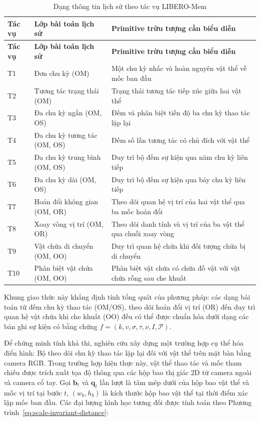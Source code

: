 \begingroup\small\setlength{\tabcolsep}{4pt}\renewcommand{\arraystretch}{1.12}
\begin{longtable}{>{\raggedright\arraybackslash}p{}|>{\raggedright\arraybackslash}p{}|>{\raggedright\arraybackslash}p{}}
\caption{Dạng thông tin lịch sử theo tác vụ LIBERO-Mem}\label{tab:memory-task-families}\\
\toprule
\textbf{Tác vụ} & \textbf{Lớp bài toán lịch sử} & \textbf{Primitive trừu tượng cần biểu diễn} \\
\midrule\endfirsthead
\toprule
\textbf{Tác vụ} & \textbf{Lớp bài toán lịch sử} & \textbf{Primitive trừu tượng cần biểu diễn} \\
\midrule\endhead
\bottomrule\endfoot
T1 & Đơn chu kỳ (OM) & Một chu kỳ nhấc và hoàn nguyên vật thể về mốc ban đầu \\
T2 & Tương tác trạng thái (OM) & Trạng thái tương tác tiếp xúc giữa hai vật thể \\
T3 & Đa chu kỳ ngắn (OM, OS) & Đếm và phân biệt tiến độ ba chu kỳ thao tác lặp lại \\
T4 & Đa chu kỳ tương tác (OM, OS) & Đếm số lần tương tác có chủ đích với vật thể \\
T5 & Đa chu kỳ trung bình (OM, OS) & Duy trì bộ đếm sự kiện qua năm chu kỳ liên tiếp \\
T6 & Đa chu kỳ dài (OM, OS) & Duy trì bộ đếm sự kiện qua bảy chu kỳ liên tiếp \\
T7 & Hoán đổi không gian (OM, OR) & Theo dõi quan hệ vị trí của hai vật thể qua ba mốc hoán đổi \\
T8 & Xoay vòng vị trí (OM, OR) & Theo dõi danh tính và vị trí của ba vật thể qua chuỗi xoay vòng \\
T9 & Vật chứa di chuyển (OM, OO) & Duy trì quan hệ chứa khi đối tượng chứa bị di chuyển \\
T10 & Phân biệt vật chứa (OM, OO) & Phân biệt vật chứa có chứa đồ vật với vật chứa rỗng sau che khuất \\
\end{longtable}
\endgroup

Khung giao thức này khẳng định tính tổng quát của phương pháp: các dạng bài toán từ đếm chu kỳ thao tác (OM/OS), theo dõi hoán đổi vị trí (OR) đến duy trì quan hệ vật chứa khi che khuất (OO) đều có thể được chuẩn hóa dưới dạng các bản ghi sự kiện có bằng chứng $f = (k, v, \sigma, \tau, \nu, I, \mathcal P)$.

Để chứng minh tính khả thi, nghiên cứu xây dựng một trường hợp cụ thể hóa điển hình: Bộ theo dõi chu kỳ thao tác lặp lại đối với vật thể trên mặt bàn bằng camera RGB. Trong trường hợp hiện thực này, vật thể thao tác và mốc tham chiếu được trích xuất tọa độ thông qua các hộp bao thị giác 2D từ camera ngoài và camera cổ tay. Gọi $\mathbf b_t$ và $\mathbf q_t$ lần lượt là tâm mép dưới của hộp bao vật thể và mốc vị trí tại bước $t$, $(w_b, h_b)$ là kích thước hộp bao vật thể tại thời điểm xác lập mốc ban đầu. Các đại lượng hình học tương đối được tính toán theo Phương trình~\eqref{eq:scale-invariant-distance}:

